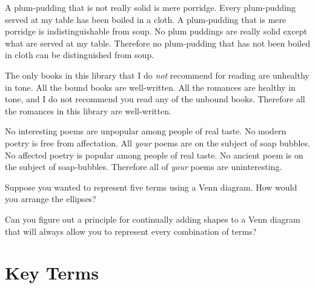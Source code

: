 \begin{exercises}
\item \label{itm:plum-pudding} A plum-pudding that is not really solid is mere porridge. Every plum-pudding served at my table has been boiled in a cloth. A plum-pudding that is mere porridge is indistinguishable from soup. No plum puddings are really solid except what are served at my table. Therefore no plum-pudding that has not been boiled in cloth can be distinguished from soup. %

\item \label{itm:books} The only books in this library that I do \textit{not} recommend for reading are unhealthy in tone. All the bound books are well-written. All the romances are healthy in tone, and I do not recommend you read any of the unbound books. Therefore all the romances in this library are well-written. 

\item \label{itm: poems} No interesting poems are unpopular among people of real taste. No modern poetry is free from affectation. All \textit{your} poems are on the subject of soap bubbles. No affected poetry is popular among people of real taste. No ancient poem is on the subject of soap-bubbles. Therefore all of \textit{your} poems are uninteresting. %

\end{exercises}
                                    
\noindent\problempart
\begin{exercises}
\item Suppose you wanted to represent five terms using a Venn diagram. How would you arrange the ellipses? 
\item Can you figure out a principle for continually adding shapes to a Venn diagram that will always allow you to represent every combination of terms?
\end{exercises}


\section*{Key Terms}
\begin{sortedlist}
\end{sortedlist}
